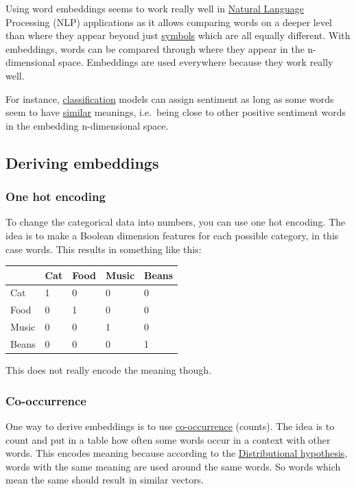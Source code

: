 \documentclass[
  11pt,
  british,
]{article}
\begin{document}
Using word embeddings seems to work really well in
\href{../Languages/Natural\%20languages.md}{Natural Language} Processing
(NLP) applications as it allows comparing words on a deeper level than
where they appear beyond just \href{../Data/Symbol.md}{symbols} which
are all equally different. With embeddings, words can be compared
through where they appear in the n-dimensional space. Embeddings are
used everywhere because they work really well.

For instance, \href{../Classification.md}{classification} models can
assign sentiment as long as some words seem to have
\href{Word\%20similarity.md}{similar} meanings, i.e.~being close to
other positive sentiment words in the embedding n-dimensional space.

\hypertarget{deriving-embeddings}{%
\subsection{Deriving embeddings}\label{deriving-embeddings}}

\hypertarget{one-hot-encoding}{%
\subsubsection{One hot encoding}\label{one-hot-encoding}}

To change the categorical data into numbers, you can use one hot
encoding. The idea is to make a Boolean dimension features for each
possible category, in this case words. This results in something like
this:

\begin{longtable}[]{@{}lllll@{}}
\toprule
& Cat & Food & Music & Beans \\
\midrule
\endhead
Cat & 1 & 0 & 0 & 0 \\
Food & 0 & 1 & 0 & 0 \\
Music & 0 & 0 & 1 & 0 \\
Beans & 0 & 0 & 0 & 1 \\
\bottomrule
\end{longtable}

This does not really encode the meaning though.

\hypertarget{co-occurrence-1}{%
\subsubsection{Co-occurrence}\label{co-occurrence-1}}

One way to derive embeddings is to use
\href{Co-occurrence.md}{co-occurrence} (counts). The idea is to count
and put in a table how often some words occur in a context with other
words. This encodes meaning because according to the
\href{Distributional\%20hypothesis.md}{Distributional hypothesis}, words
with the same meaning are used around the same words. So words which
mean the same should result in similar vectors.
\end{document}

